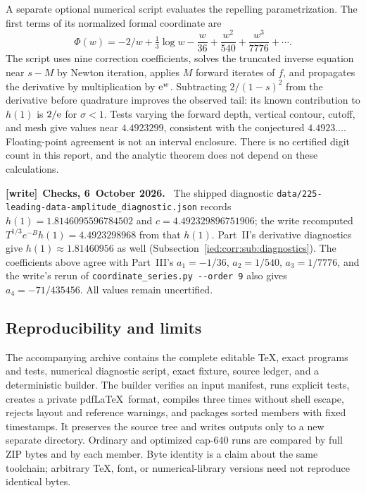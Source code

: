 \documentclass[11pt,letterpaper]{article}
\theoremstyle{remark}\newtheorem{remark}[theorem]{Remark}
\newcommand{\file}[1]{\nolinkurl{#1}}
\newenvironment{writenote}[1][]{\par\smallskip\begingroup\small
 \noindent\textbf{[write]}\if\relax\detokenize{#1}\relax\else~\textbf{#1.}\fi\ }%
 {\par\endgroup\smallskip}
\begin{document}
A separate optional numerical script evaluates the repelling parametrization. The first terms of its normalized formal coordinate are
\[
 \Phi(w)=-2/w+\tfrac13\log w-\frac w{36}
          +\frac{w^2}{540}+\frac{w^3}{7776}+\cdots.
\]
The script uses nine correction coefficients, solves the truncated inverse equation near $s-M$ by Newton iteration, applies $M$ forward iterates of $f$, and propagates the derivative by multiplication by $\mathrm e^w$. Subtracting $2/(1-s)^2$ from the derivative before quadrature improves the observed tail: its known contribution to $h(1)$ is $2/\mathrm e$ for $\sigma<1$. Tests varying the forward depth, vertical contour, cutoff, and mesh give values near $4.4923299$, consistent with the conjectured $4.4923\ldots$. Floating-point agreement is not an interval enclosure. There is no certified digit count in this report, and the analytic theorem does not depend on these calculations.

\begin{writenote}[Checks, 6~October 2026]
The shipped diagnostic \file{data/225-leading-data-amplitude_diagnostic.json} records $h(1)=1.8146095596784502$ and $c=4.492329896751906$; the write recomputed $T^{1/3}e^{-B}h(1)=4.4923298968$ from that $h(1)$. Part~II's derivative diagnostics give $h(1)\approx1.81460956$ as well (Subsection~\ref{ied:corr:sub:diagnostics}). The coefficients above agree with Part~III's $a_1=-1/36$, $a_2=1/540$, $a_3=1/7776$, and the write's rerun of \file{coordinate_series.py --order 9} also gives $a_4=-71/435456$. All values remain uncertified.
\end{writenote}

\subsection{Reproducibility and limits}
The accompanying archive contains the complete editable TeX, exact programs and tests, numerical diagnostic script, exact fixture, source ledger, and a deterministic builder. The builder verifies an input manifest, runs explicit tests, creates a private pdf\LaTeX\ format, compiles three times without shell escape, rejects layout and reference warnings, and packages sorted members with fixed timestamps. It preserves the source tree and writes outputs only to a new separate directory. Ordinary and optimized cap-$640$ runs are compared by full ZIP bytes and by each member. Byte identity is a claim about the same toolchain; arbitrary TeX, font, or numerical-library versions need not reproduce identical bytes.
\end{document}
